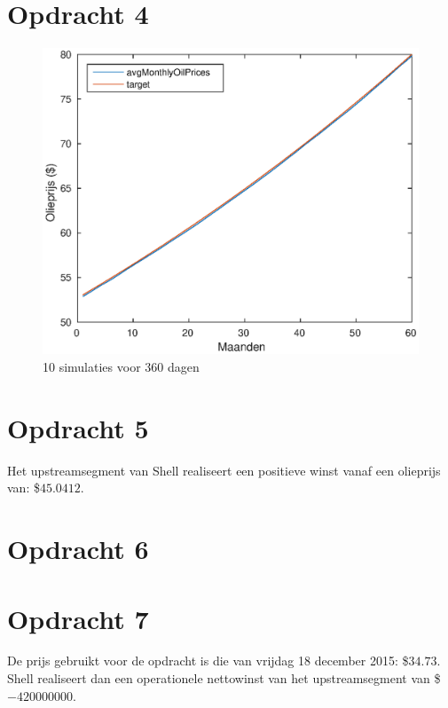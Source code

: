 \documentclass[11pt,a4paper]{article}
\begin{document}


\section*{Opdracht 4}

\begin{figure}[H]
\centering
\includegraphics[scale=0.75]{opdracht4}
\caption{10 simulaties voor 360 dagen}
\end{figure}



\section*{Opdracht 5}
Het upstreamsegment van Shell realiseert een positieve winst vanaf een olieprijs van: \$$45.0412$.


\section*{Opdracht 6}



\section*{Opdracht 7}
De prijs gebruikt voor de opdracht is die van vrijdag 18 december 2015: \$$34.73$.
Shell realiseert dan een operationele nettowinst van het upstreamsegment van \$$-420000000$.

\end{document}
